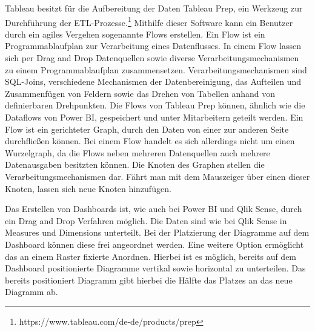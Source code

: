 Tableau besitzt für die Aufbereitung der Daten Tableau Prep, ein Werkzeug zur Durchführung der
ETL-Prozesse.\footnote{https://www.tableau.com/de-de/products/prep} Mithilfe dieser Software kann ein Benutzer
durch ein agiles Vergehen sogenannte Flows erstellen. Ein Flow ist ein Programmablaufplan
zur Verarbeitung eines Datenflusses. In einem Flow lassen sich per Drag and Drop
Datenquellen sowie diverse Verarbeitungsmechanismen zu einem Programmablaufplan
zusammensetzen. Verarbeitungsmechanismen sind SQL-Joins, verschiedene Mechanismen der Datenbereinigung,
das Aufteilen und Zusammenfügen von Feldern sowie das Drehen von Tabellen anhand
von definierbaren Drehpunkten.\cite{PrepareYourDataForTableauBook} Die Flows von Tableau Prep können,
ähnlich wie die Dataflows von Power BI, gespeichert und unter Mitarbeitern geteilt werden. Ein Flow ist ein gerichteter Graph,
durch den Daten von einer zur anderen Seite durchfließen können. Bei einem Flow handelt es sich allerdings nicht um einen Wurzelgraph,
da die Flows neben mehreren Datenquellen auch mehrere Datenausgaben besitzten können. Die Knoten des Graphen
stellen die Verarbeitungsmechanismen dar. Fährt man mit dem Mauszeiger über einen dieser
Knoten, lassen sich neue Knoten hinzufügen.

Das Erstellen von Dashboards ist, wie auch bei Power BI und Qlik Sense, durch ein Drag and Drop Verfahren möglich.
Die Daten sind wie bei Qlik Sense in Measures und Dimensions unterteilt. Bei der Platzierung der Diagramme auf dem
Dashboard können diese frei angeordnet werden. Eine weitere Option ermöglicht das an einem Raster fixierte Anordnen.
Hierbei ist es möglich, bereits auf dem Dashboard positionierte Diagramme vertikal sowie horizontal zu unterteilen.
Das bereits positioniert Diagramm gibt hierbei die Hälfte das Platzes an das neue Diagramm ab.
